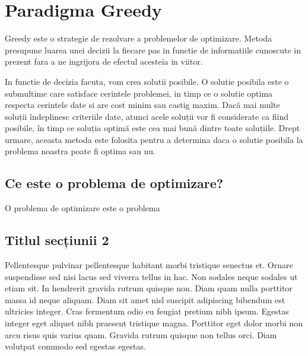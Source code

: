 \chapter{Paradigma Greedy}
 Greedy este o strategie de rezolvare a problemelor de optimizare. Metoda presupune luarea unei decizii la fiecare pas in functie de informatiile cunoscute in prezent fara a ne ingrijora de efectul acesteia in viitor. \par
 In functie de decizia facuta, vom crea solutii posibile.  O solutie posibila este o submultime care satisface cerintele problemei, in timp ce o solutie optima respecta cerintele date si are cost minim sau castig maxim. Dacă mai multe soluții îndeplinesc criteriile date, atunci acele soluții vor fi considerate ca fiind posibile, în timp ce soluția optimă este cea mai bună dintre toate soluțiile.
 Drept urmare, aceasta metoda este folosita pentru a determina daca o solutie posibila la problema noastra poate fi optima sau nu.

\section{Ce este o problema de optimizare?}
O problema de optimizare este o problema 





\section{Titlul secțiunii 2}

Pellentesque pulvinar pellentesque habitant morbi tristique senectus et. Ornare suspendisse sed nisi lacus sed viverra tellus in hac. Non sodales neque sodales ut etiam sit. In hendrerit gravida rutrum quisque non. Diam quam nulla porttitor massa id neque aliquam. Diam sit amet nisl suscipit adipiscing bibendum est ultricies integer. Cras fermentum odio eu feugiat pretium nibh ipsum. Egestas integer eget aliquet nibh praesent tristique magna. Porttitor eget dolor morbi non arcu risus quis varius quam. Gravida rutrum quisque non tellus orci. Diam volutpat commodo sed egestas egestas.